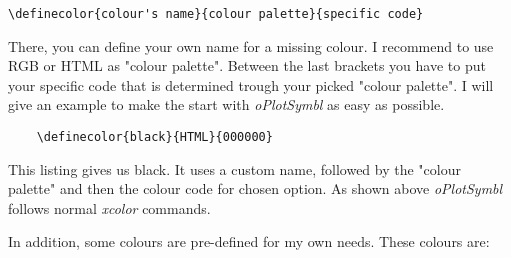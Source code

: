 \documentclass[
	a4paper,
	parskip=half,
    pagesize=auto,      		%
    listof=totoc,   		%
    bibliography=totoc,
	11pt
]{scrartcl}
\begin{document}
\begin{lstlisting}
\definecolor{colour's name}{colour palette}{specific code}
\end{lstlisting}

There, you can define your own name for a missing colour. I recommend to use RGB or HTML as "colour palette". Between the last brackets you have to put your specific code that is determined trough your picked  "colour palette". I will give an example to make the start with \textit{oPlotSymbl} as easy as possible. 

\begin{lstlisting}
	\definecolor{black}{HTML}{000000}
\end{lstlisting}

This listing gives us black. It uses a custom name, followed by the "colour palette" and then the colour code for chosen option. As shown above \textit{oPlotSymbl} follows normal \textit{xcolor} \cite{xcolor} commands.
  
In addition, some colours are pre-defined for my own needs. These colours are:
\end{document}

